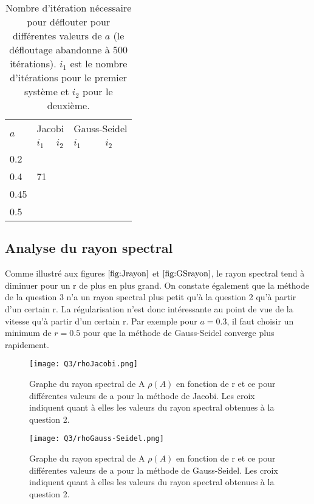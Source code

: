 \begin{table}
  \centering
  \begin{tabular}{|l|l|l|l|l|}
    \hline
    \multirow{2}{*}{$a$} & \multicolumn{2}{l|}{Jacobi} & \multicolumn{2}{l|}{Gauss-Seidel}\\
    \cline{2-5}
        & $i_1$ & $i_2$ & $i_1$ & $i_2$\\
    \hline
    0.2 &     &     &     & \\
    \hline
    0.4 & 71    &     &     & \\
    \hline
    0.45&   &    &     & \\
    \hline
    0.5 &    &   &    & \\
    \hline
  \end{tabular}
  \caption{Nombre d'itération nécessaire pour déflouter pour différentes valeurs de $a$ (le défloutage abandonne à 500 itérations).
  $i_1$ est le nombre d'itérations pour le premier système et $i_2$ pour le deuxième.}
  \label{tab:iter}
\end{table}

\subsection{Analyse du rayon spectral}

Comme illustré aux figures $\ref{fig:Jrayon}$ et $\ref{fig:GSrayon}$, le rayon spectral tend à diminuer pour un r de plus en plus grand. On constate également que la méthode de la question 3 n'a un rayon spectral plus petit qu'à la question 2 qu'à partir d'un certain r. La régularisation n'est donc intéressante au point de vue de la vitesse qu'à partir d'un certain r. Par exemple pour $a = 0.3$, il faut choisir un minimum de $r = 0.5$ pour que la méthode de Gauss-Seidel converge plus rapidement. 


\begin{figure} \label{fig:Jrayon}
  \centering
  \texttt{[image: Q3/rhoJacobi.png]}
  \caption{Graphe du rayon spectral de A $\rho(A)$ en fonction de r et ce pour différentes valeurs de a pour la méthode de Jacobi. Les croix indiquent quant à elles les valeurs du rayon spectral obtenues à la question 2.}
  \label{fig:ar}
\end{figure}

 \begin{figure} \label{fig:GSrayon}
  \centering
  \texttt{[image: Q3/rhoGauss-Seidel.png]}
  \caption{Graphe du rayon spectral de A $\rho(A)$ en fonction de r et ce pour différentes valeurs de a pour la méthode de Gauss-Seidel. Les croix indiquent quant à elles les valeurs du rayon spectral obtenues à la question 2.}
  \label{fig:ar}
\end{figure}
